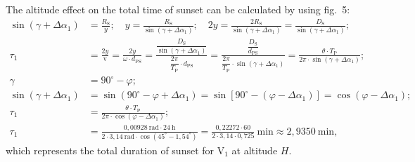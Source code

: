 \begin{description}
  The altitude effect on the total time of sunset can be calculated by using
  fig.~5:
  \begin{align*}
  \sin(\gamma + \Delta\alpha_1) &= \frac{R_{\mathrm{S}}}{y};\quad
    y = \frac{R_{\mathrm{S}}}{\sin(\gamma + \Delta\alpha_1)};\quad
    2y = \frac{2R_{\mathrm{S}}}{\sin(\gamma + \Delta\alpha_1)}
       = \frac{D_{\mathrm{S}}}{\sin(\gamma + \Delta\alpha_1)};\\
  \tau_1 &= \frac{2y}{\mathrm{v}}
    = \frac{2y}{\omega\cdot d_{\mathrm{PS}}}
    = \frac{\dfrac{D_{\mathrm{S}}}{\sin(\gamma + \Delta\alpha_1)}}
           {\dfrac{2\pi}{T_{\mathrm{P}}}\cdot d_{\mathrm{PS}}}
    = \frac{\dfrac{D_{\mathrm{S}}}{d_{\mathrm{PS}}}}
           {\dfrac{2\pi}{T_{\mathrm{P}}}\cdot\sin(\gamma + \Delta\alpha_1)}
    = \frac{\theta\cdot T_{\mathrm{P}}}
           {2\pi\cdot\sin(\gamma + \Delta\alpha_1)};\\
  \gamma &= 90^\circ - \varphi;\\
  \sin(\gamma + \Delta\alpha_1)
    &= \sin(90^\circ - \varphi + \Delta\alpha_1)
     = \sin[90^\circ - (\varphi - \Delta\alpha_1)]
     = \cos(\varphi - \Delta\alpha_1);\\
  \tau_1 &= \frac{\theta\cdot T_{\mathrm{P}}}
                {2\pi\cdot\cos(\varphi - \Delta\alpha_1)};\\
  \tau_1 &= \frac{0{,}00928\ \mathrm{rad}\cdot 24\ \mathrm{h}}
               {2\cdot 3{,}14\ \mathrm{rad}\cdot\cos(45^\circ - 1{,}54^\circ)}
    = \frac{0{,}22272\cdot 60}{2\cdot 3{,}14\cdot 0{,}725}\ \mathrm{min}
    \approx 2{,}9350\ \mathrm{min},
  \end{align*}
  which represents the total duration of sunset for $\mathrm{V}_1$ at
  altitude $H$.


\end{description}
